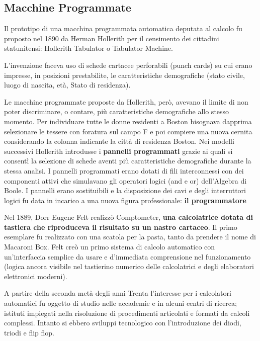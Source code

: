 \documentclass[12pt]{article} %
\begin{document}
\subsection{Macchine Programmate}
Il prototipo di una macchina programmata automatica deputata al calcolo fu proposto nel 1890 da Herman Hollerith per il censimento dei cittadini statunitensi: Hollerith Tabulator o Tabulator Machine.
\par\medskip\noindent
L’invenzione faceva uso di schede cartacee perforabili (punch cards) su cui erano impresse, in posizioni prestabilite, le caratteristiche demografiche (stato civile, luogo di nascita, età, Stato di residenza).\par\medskip\noindent
Le macchine programmate proposte da Hollerith, però, avevano il limite di non poter discriminare, o contare, più caratteristiche demografiche allo stesso momento. Per individuare tutte le donne residenti a Boston bisognava dapprima selezionare le tessere con foratura sul campo F e poi compiere una nuova cernita considerando la colonna indicante la città di residenza Boston. Nei modelli successivi Hollerith introdusse i \textbf{pannelli programmati} grazie ai quali si consentì la selezione di schede aventi più caratteristiche demografiche durante la stessa analisi. I pannelli programmati erano dotati di fili interconnessi con dei componenti attivi che simulavano gli operatori logici (and e or) dell’Algebra di Boole. I pannelli erano sostituibili e la disposizione dei cavi e degli interruttori logici fu data in incarico a una nuova figura professionale: \textbf{il programmatore}\par\medskip\noindent
Nel 1889, Dorr Eugene Felt realizzò Comptometer, \textbf{una calcolatrice dotata di tastiera che riproduceva il risultato su un nastro cartaceo}. Il primo esemplare fu realizzato con una scatola per la pasta, tanto da prendere il nome di Macaroni Box. Felt creò un primo sistema di calcolo automatico con un’interfaccia semplice da usare e d’immediata comprensione nel funzionamento (logica ancora visibile nel tastierino numerico delle calcolatrici e degli elaboratori elettronici moderni). \par\medskip\noindent
A partire della seconda metà degli anni Trenta l’interesse per i calcolatori automatici fu oggetto di studio nelle accademie e in alcuni centri di ricerca; istituti impiegati nella risoluzione di procedimenti articolati e formati da calcoli complessi. Intanto si ebbero sviluppi tecnologico con l’introduzione dei diodi, triodi e flip flop.\par\medskip\noindent
\end{document}
